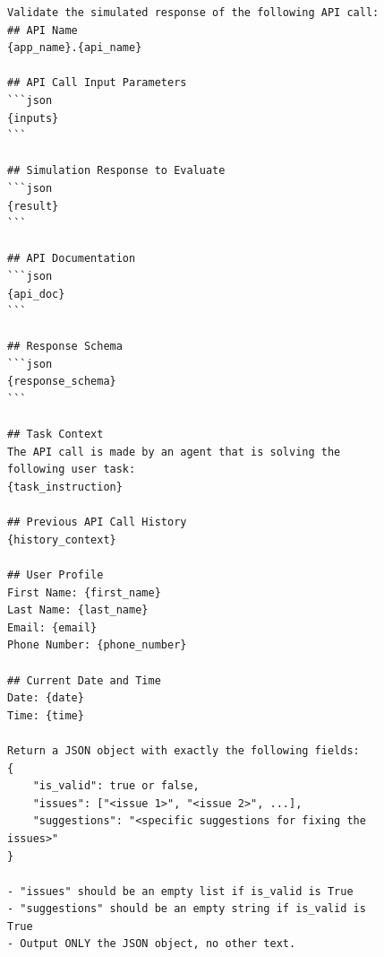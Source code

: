 \begin{figure}[t]
\begin{lstlisting}[style=prettyprompt, captionpos=b, caption={Judge user prompt template (one per simulated API call).}, label={lst:judge_user_prompt}]
Validate the simulated response of the following API call:
## API Name
{app_name}.{api_name}

## API Call Input Parameters
```json
{inputs}
```

## Simulation Response to Evaluate
```json
{result}
```

## API Documentation
```json
{api_doc}
```

## Response Schema
```json
{response_schema}
```

## Task Context
The API call is made by an agent that is solving the following user task:
{task_instruction}

## Previous API Call History
{history_context}

## User Profile
First Name: {first_name}
Last Name: {last_name}
Email: {email}
Phone Number: {phone_number}

## Current Date and Time
Date: {date}
Time: {time}

Return a JSON object with exactly the following fields:
{
    "is_valid": true or false,
    "issues": ["<issue 1>", "<issue 2>", ...],
    "suggestions": "<specific suggestions for fixing the issues>"
}

- "issues" should be an empty list if is_valid is True
- "suggestions" should be an empty string if is_valid is True
- Output ONLY the JSON object, no other text.
\end{lstlisting}
\end{figure}
